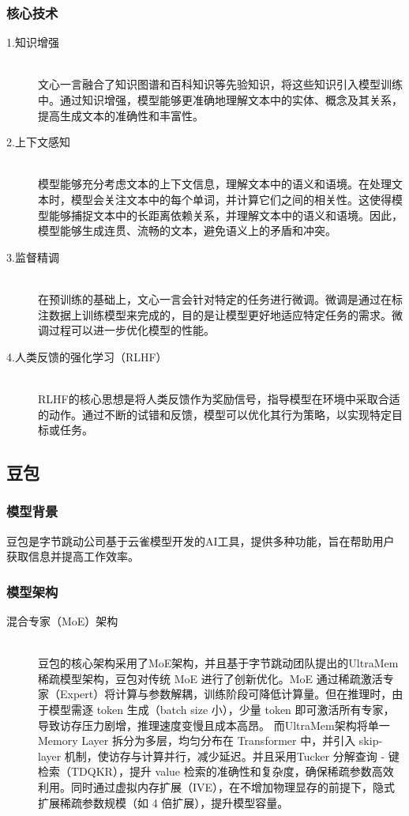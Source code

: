 \documentclass[UTF8]{ctexart}
\begin{document}
\subsubsection{核心技术}
\begin{description}
    \item[1.知识增强]\leavevmode \\
    文心一言融合了知识图谱和百科知识等先验知识，将这些知识引入模型训练中。通过知识增强，模型能够更准确地理解文本中的实体、概念及其关系，提高生成文本的准确性和丰富性。
    \item[2.上下文感知] \leavevmode \\
    模型能够充分考虑文本的上下文信息，理解文本中的语义和语境。在处理文本时，模型会关注文本中的每个单词，并计算它们之间的相关性。这使得模型能够捕捉文本中的长距离依赖关系，并理解文本中的语义和语境。因此，模型能够生成连贯、流畅的文本，避免语义上的矛盾和冲突。
    \item[3.监督精调] \leavevmode \\
    在预训练的基础上，文心一言会针对特定的任务进行微调。微调是通过在标注数据上训练模型来完成的，目的是让模型更好地适应特定任务的需求。微调过程可以进一步优化模型的性能。
    \item[4.人类反馈的强化学习（RLHF）​] \leavevmode \\
    RLHF的核心思想是将人类反馈作为奖励信号，指导模型在环境中采取合适的动作。通过不断的试错和反馈，模型可以优化其行为策略，以实现特定目标或任务。
    
\end{description}
\subsection{豆包}
\subsubsection{模型背景}
豆包是字节跳动公司基于云雀模型开发的AI工具，提供多种功能，旨在帮助用户获取信息并提高工作效率。

\subsubsection{模型架构}
\begin{description}
    \item[混合专家（MoE）架构] \leavevmode \\
    豆包的核心架构采用了MoE架构，并且基于字节跳动团队提出的UltraMem 稀疏模型架构，豆包对传统 MoE 进行了创新优化。MoE 通过稀疏激活专家（Expert）将计算与参数解耦，训练阶段可降低计算量。但在推理时，由于模型需逐 token 生成（batch size 小），少量 token 即可激活所有专家，导致访存压力剧增，推理速度变慢且成本高昂。
    而UltraMem架构将单一 Memory Layer 拆分为多层，均匀分布在 Transformer 中，并引入 skip-layer 机制，使访存与计算并行，减少延迟。并且采用Tucker 分解查询 - 键检索（TDQKR），提升 value 检索的准确性和复杂度，确保稀疏参数高效利用。同时通过虚拟内存扩展（IVE），在不增加物理显存的前提下，隐式扩展稀疏参数规模（如 4 倍扩展），提升模型容量。
\end{description}
\end{document}
